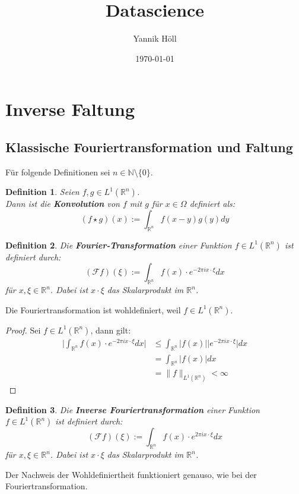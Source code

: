 \documentclass{article}
\title{Datascience}
\author{Yannik Höll}
\date{\today}
\newcommand{\R}[0]{\mathbb{R}}
\newtheorem{defin}{Definition}
\begin{document}
\maketitle

\section{Inverse Faltung}

\subsection{Klassische Fouriertransformation und Faltung}

Für folgende Definitionen sei $n \in \mathbb{N} \setminus \{ 0 \}$.

\begin{defin}
    Seien $f,g \in L^1(\R^n)$. \\
    Dann ist die \textbf{Konvolution} von $f$ mit $g$ für $x \in \Omega$ definiert als:
    \begin{equation}
        (f \star g)(x) := \int_{\R^n} f(x - y) g(y) dy
    \end{equation}
\end{defin}

\begin{defin} Die \textbf{Fourier-Transformation} einer Funktion $f \in L^1(\R^n)$ ist definiert durch:
    \begin{equation}
        (\mathcal{F}f)(\xi) := \int_{\R^n} f(x) \cdot e^{-2\pi i x \cdot \xi} dx
    \end{equation}
    für $x, \xi \in \R^n$. Dabei ist $x \cdot \xi$ das Skalarprodukt im $\R^n$.
\end{defin}

Die Fouriertransformation ist wohldefiniert, weil $f \in L^1(\R^n)$.
\begin{proof}
    Sei $f \in L^1(\R^n)$, dann gilt:
    \begin{align*}
        \Bigg\lvert \int_{\R^n} f(x) \cdot e^{-2\pi i x \cdot \xi} dx \Bigg\rvert &\leq \int_{\R^n} \lvert f(x) \rvert \lvert e^{-2\pi i x \cdot \xi} \rvert dx \\
        &= \int_{\R^n} \lvert f(x) \rvert dx \\
        &= \lVert f \rVert_{L^1(\R^n)} < \infty
    \end{align*}
\end{proof}

\begin{defin}
    Die \textbf{Inverse Fouriertransformation} einer Funktion $f \in L^1(\R^n)$ ist definiert durch:
    \begin{equation}
        (\mathcal{F}f)(\xi) := \int_{\R^n} f(x) \cdot e^{2\pi i x \cdot \xi} dx
    \end{equation}
    für $x, \xi \in \R^n$. Dabei ist $x \cdot \xi$ das Skalarprodukt im $\R^n$.
\end{defin}
Der Nachweis der Wohldefiniertheit funktioniert genauso, wie bei der Fouriertransformation.
\end{document}
